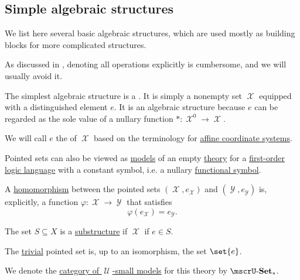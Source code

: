\subsection{Simple algebraic structures}\label{subsec:simple_algebraic_structures}

We list here several basic algebraic structures, which are used mostly as building blocks for more complicated structures.

As discussed in , denoting all operations explicitly is cumbersome, and we will usually avoid it.

\begin{definition}\label{def:pointed_set}
  The simplest algebraic structure is a . It is simply a nonempty set \( \mscrX \) equipped with a distinguished element \( e \). It is an algebraic structure because \( e \) can be regarded as the sole value of a nullary function \( *: \mscrX^0 \to \mscrX \).

  We will call \( e \) the  of \( \mscrX \) based on the terminology for \hyperref[def:euclidean_plane_coordinate_system/origin]{affine coordinate systems}.

  \begin{thmenum}
     Pointed sets can also be viewed as \hyperref[def:first_order_semantics/satisfiability]{models} of an empty \hyperref[def:first_order_theory]{theory} for a \hyperref[def:first_order_language]{first-order logic language} with a constant symbol, i.e. a nullary \hyperref[def:first_order_language/func]{functional symbol}.

     A \hyperref[def:first_order_homomorphism]{homomorphism} between the pointed sets \( (\mscrX, e_{\mscrX}) \) and \( (\mscrY, e_{\mscrY}) \) is, explicitly, a function \( \varphi: \mscrX \to \mscrY \) that satisfies
    \begin{equation}\label{eq:def:pointed_set/homomorphism}
      \varphi(e_{\mscrX}) = e_{\mscrY}.
    \end{equation}

     The set \( S \subseteq X \) is a \hyperref[def:first_order_substructure]{substructure} if \( \mscrX \) if \( e \in S \).

     The \hyperref[thm:substructures_form_complete_lattice/bottom]{trivial} pointed set is, up to an isomorphism, the set \( \set{ e } \).

     We denote the \hyperref[def:category_of_small_first_order_models]{category of \( \mscrU \)-small models} for this theory by \( \ucat{Set}_* \).
  \end{thmenum}
\end{definition}

